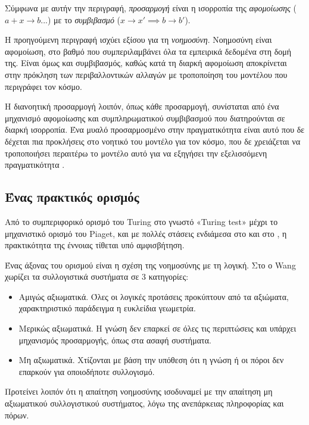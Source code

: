   Σύμφωνα με αυτήν την περιγραφή, \textit{προσαρμογή} είναι η ισορροπία της \textit{αφομοίωσης} ($a+x\rightarrow b$...) με το \textit{συμβιβασμό} ($x\rightarrow x' \implies b\rightarrow b'$).

  Η προηγούμενη περιγραφή ισχύει εξίσου για τη \textit{νοημοσύνη}. Νοημοσύνη είναι αφομοίωση, στο βαθμό που συμπεριλαμβάνει όλα τα εμπειρικά δεδομένα στη δομή της.
  Είναι όμως και συμβιβασμός, καθώς κατά τη διαρκή αφομοίωση αποκρίνεται στην πρόκληση των περιβαλλοντικών αλλαγών με τροποποίηση του μοντέλου που περιγράφει τον κόσμο.

  Η διανοητική προσαρμογή λοιπόν, όπως κάθε προσαρμογή, συνίσταται από ένα μηχανισμό αφομοίωσης και συμπληρωματικού συμβιβασμού που διατηρούνται σε διαρκή ισορροπία.
  Ένα μυαλό προσαρμοσμένο στην πραγματικότητα είναι αυτό που δε δέχεται πια προκλήσεις στο νοητικό του μοντέλο για τον κόσμο,
  που δε χρειάζεται να τροποποιήσει περαιτέρω το μοντέλο αυτό για να εξηγήσει την εξελισσόμενη πραγματικότητα \parencite[σελ 5-7]{piagetOriginsIntelligenceChildren1952}.

\subsection*{Ένας πρακτικός ορισμός}

  Από το συμπεριφορικό ορισμό του Turing στο γνωστό «Turing test» μέχρι το μηχανιστικό ορισμό του Piaget,
  και με πολλές στάσεις ενδιάμεσα στο \cite[Lenat][]{lenatThresholdsKnowledge1991} και στο \cite[Minsky][]{minskySocietyMind1988},
  η πρακτικότητα της έννοιας τίθεται υπό αμφισβήτηση.

  Ένας άξονας του ορισμού είναι η σχέση της νοημοσύνης με τη λογική. Στο \cite{wangCognitiveLogicMathematical}
  ο Wang χωρίζει τα συλλογιστικά συστήματα σε 3 κατηγορίες:
  \begin{itemize}
    \item Αμιγώς αξιωματικά. Όλες οι λογικές προτάσεις προκύπτουν από τα αξιώματα, χαρακτηριστικό παράδειγμα η ευκλείδια γεωμετρία.
    \item Μερικώς αξιωματικά. Η γνώση δεν επαρκεί σε όλες τις περιπτώσεις και υπάρχει μηχανισμός προσαρμογής, όπως στα ασαφή συστήματα.
    \item Μη αξιωματικά. Χτίζονται με βάση την υπόθεση ότι η γνώση ή οι πόροι δεν επαρκούν για οποιοδήποτε συλλογισμό.
  \end{itemize}

  Προτείνει λοιπόν ότι η απαίτηση νοημοσύνης ισοδυναμεί με την απαίτηση μη αξιωματικού συλλογιστικού συστήματος,
  λόγω της ανεπάρκειας πληροφορίας και πόρων.

